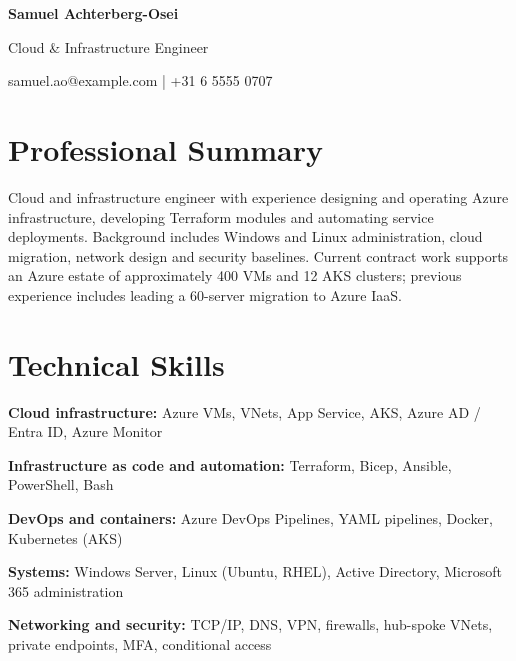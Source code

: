 \documentclass[10pt,a4paper]{article}
\newcommand{\cvsection}[1]{\section*{#1}}
\begin{document}
{\LARGE\bfseries\color{primarycolor} Samuel Achterberg-Osei}\par
{\large\color{accentcolor} Cloud \& Infrastructure Engineer}\par
samuel.ao@example.com | +31 6 5555 0707

\cvsection{Professional Summary}
Cloud and infrastructure engineer with experience designing and operating Azure infrastructure, developing Terraform modules and automating service deployments. Background includes Windows and Linux administration, cloud migration, network design and security baselines. Current contract work supports an Azure estate of approximately 400 VMs and 12 AKS clusters; previous experience includes leading a 60-server migration to Azure IaaS.

\cvsection{Technical Skills}
\textbf{Cloud infrastructure:} Azure VMs, VNets, App Service, AKS, Azure AD / Entra ID, Azure Monitor\par
\textbf{Infrastructure as code and automation:} Terraform, Bicep, Ansible, PowerShell, Bash\par
\textbf{DevOps and containers:} Azure DevOps Pipelines, YAML pipelines, Docker, Kubernetes (AKS)\par
\textbf{Systems:} Windows Server, Linux (Ubuntu, RHEL), Active Directory, Microsoft 365 administration\par
\textbf{Networking and security:} TCP/IP, DNS, VPN, firewalls, hub-spoke VNets, private endpoints, MFA, conditional access
\end{document}

